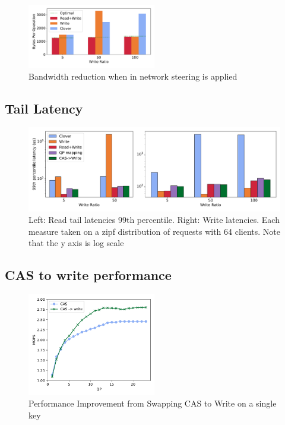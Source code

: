 \begin{figure}
    \includegraphics[width=0.5\textwidth]{fig/bandwidth_reduction.pdf}
    \caption{{Bandwidth reduction when in network steering is applied}}
    \label{fig:bandwidth_reduction}
\end{figure}


\subsection{Tail Latency}

\begin{figure}
    \includegraphics[width=1.0\textwidth]{fig/99th_latency.pdf}

    \caption{Left: Read tail latencies 99th percentile. Right: Write latencies.
    Each measure taken on a zipf distribution of requests with 64 clients. Note that the y axis is log scale}

    \label{fig:tail_latency}
\end{figure}

\subsection{CAS to write performance}

\begin{figure}
    \includegraphics[width=0.5\textwidth]{fig/cas_vs_swap.pdf}
    \caption{Performance Improvement from Swapping CAS to Write on a single key}
    \label{fig:cas_vs_swap}
\end{figure}

